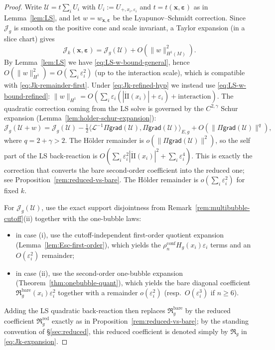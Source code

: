 \documentclass[11pt,reqno,a4paper]{amsart}
\numberwithin{equation}{section}
\theoremstyle{plain}
\theoremstyle{remark}
\theoremstyle{plain}
\begin{document}
\begin{proof}
Write $\mathcal U=t\sum_i U_i$ with $U_i:=U_{+,x_i,\varepsilon_i}$ and $t=t(\mathbf x,\boldsymbol\varepsilon)$ as in
Lemma~\ref{lem:LS}, and let $w=w_{\mathbf x,\boldsymbol\varepsilon}$ be the Lyapunov--Schmidt correction.
Since $\mathcal J_g$ is smooth on the positive cone and scale invariant,
a Taylor expansion (in a slice chart) gives
\[
\mathcal J_k(\mathbf x,\boldsymbol\varepsilon)=\mathcal J_g(\mathcal U)+O(\|w\|_{H^1(M)}^2).
\]
By Lemma~\ref{lem:LS} we have \eqref{eq:LS-w-bound-general}, hence $O(\|w\|_{H^1}^2)=O(\sum_i\varepsilon_i^2)$
(up to the interaction scale), which is compatible with \eqref{eq:Jk-remainder-first}. Under
\eqref{eq:Jk-refined-hyp} we instead use \eqref{eq:LS-w-bound-refined}:
$\|w\|_{H^1}=O(\sum_i\varepsilon_i(|\mathring{\mathrm{II}}(x_i)|+\varepsilon_i)+\text{interaction})$.
The quadratic correction coming from the LS solve is governed by the
$C^{2,\gamma}$ Schur expansion (Lemma~\ref{lem:holder-schur-expansion}):
\[
\mathcal J_g(\mathcal U+w)=\mathcal J_g(\mathcal U)-\tfrac12\big\langle \mathcal L^{-1}\Pi\mathsf{grad}(\mathcal U),
\Pi\mathsf{grad}(\mathcal U)\big\rangle_{E,g}+O(\|\Pi\mathsf{grad}(\mathcal U)\|^q),
\]
where $q=2+\gamma>2$.  The H\"older remainder is $o(\|\Pi\mathsf{grad}(\mathcal U)\|^2)$,
so the self part of the LS back-reaction is $O(\sum_i\varepsilon_i^2|\mathring{\mathrm{II}}(x_i)|^2+\sum_i\varepsilon_i^4)$.
This is exactly the correction that converts the bare second-order coefficient into the reduced one;
see Proposition~\ref{rem:reduced-vs-bare}. The H\"older remainder is
$o(\sum_i\varepsilon_i^2)$ for fixed $k$.

For $\mathcal J_g(\mathcal U)$, use the exact support disjointness from
Remark~\ref{rem:multibubble-cutoff}\textup{(ii)} together with the one-bubble laws:
\begin{itemize}
\item in case \textup{(i)}, use the cutoff-independent first-order quotient expansion
(Lemma~\ref{lem:Esc-first-order}), which yields the
$\rho_n^{\mathrm{conf}}H_g(x_i)\varepsilon_i$ terms and an $O(\varepsilon_i^2)$ remainder;
\item in case \textup{(ii)}, use the second-order one-bubble expansion (Theorem~\ref{thm:onebubble-quant}),
which yields the bare diagonal coefficient $\mathfrak R_g^{\mathrm{bare}}(x_i)\varepsilon_i^2$
together with a remainder $o(\varepsilon_i^2)$
(resp.\ $O(\varepsilon_i^3)$ if $n\ge6$).
\end{itemize}
Adding the LS quadratic back-reaction then replaces $\mathfrak R_g^{\mathrm{bare}}$ by the reduced coefficient
$\mathfrak R_g^{\mathrm{red}}$ exactly as in Proposition~\ref{rem:reduced-vs-bare}; by the standing convention of
\S\ref{sec:reduced}, this reduced coefficient is denoted simply by $\mathfrak R_g$ in
\eqref{eq:Jk-expansion}.


\end{proof}
\end{document}

